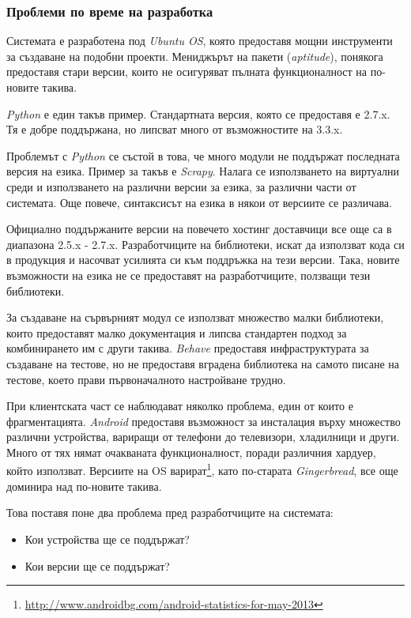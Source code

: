 \subsubsection{Проблеми по време на разработка}

	Системата е разработена под \emph{Ubuntu \ac{OS}}, която предоставя мощни инструменти за създаване на подобни проекти. Мениджърът на пакети (\emph{aptitude}), понякога предоставя стари версии, които не осигуряват пълната функционалност на по-новите такива.
	
	\emph{Python} е един такъв пример. Стандартната версия, която се предоставя е 2.7.x. Тя е добре поддържана, но липсват много от възможностите на 3.3.x. 
	
	Проблемът с \emph{Python} се състой в това, че много модули не поддържат последната версия на езика. Пример за такъв е \emph{Scrapy}. Налага се използването на виртуални среди и използването на различни версии за езика, за различни части от системата. Още повече, синтаксисът на езика в някои от версиите се различава.
	
	Официално поддържаните версии на повечето хостинг доставчици все още са в диапазона 2.5.x - 2.7.x. Разработчиците на библиотеки, искат да използват кода си в продукция и насочват усилията си към поддръжка на тези версии. Така, новите възможности на езика не се предоставят на разработчиците, ползващи тези библиотеки.
	
	За създаване на сървърният модул се използват множество малки библиотеки, които предоставят малко документация и липсва стандартен подход за комбинирането им с други такива. \emph{Behave} предоставя инфраструктурата за създаване на тестове, но не предоставя вградена библиотека на самото писане на тестове, което прави първоначалното настройване трудно.
	
	При клиентската част се наблюдават няколко проблема, един от които е фрагментацията. \emph{Android} предоставя възможност за инсталация върху множество различни устройства, вариращи от телефони до телевизори, хладилници и други. Много от тях нямат очакваната функционалност, поради различния хардуер, който използват. Версиите на \ac{OS} варират\footnote{\url{http://www.androidbg.com/android-statistics-for-may-2013}}, като по-старата \emph{Gingerbread}, все още доминира над по-новите такива.
	
	Това поставя поне два проблема пред разработчиците на системата:
	
	\begin{itemize}
		\item Кои устройства ще се поддържат?
		\item Кои версии ще се поддържат?
	\end{itemize}
	
